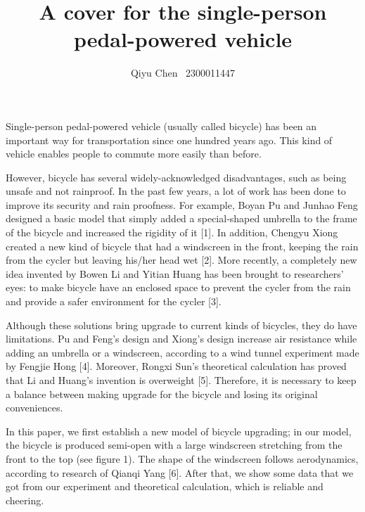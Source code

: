 \documentclass[a4paper,12pt]{article}
\title{A cover for the single-person pedal-powered vehicle}
\author{Qiyu Chen\,\,\, 2300011447}
\begin{document}
	\maketitle
	
	Single-person pedal-powered vehicle (usually called bicycle) has been an important way for transportation since one hundred years ago. This kind of vehicle enables people to commute more easily than before. 
	
	However, bicycle has several widely-acknowledged disadvantages, such as being unsafe and not rainproof. 
	In the past few years, a lot of work has been done to improve its security and rain proofness. For example, Boyan Pu and Junhao Feng designed a basic model that simply added a special-shaped umbrella to the frame of the bicycle and increased the rigidity of it [1]. In addition, Chengyu Xiong created a new kind of bicycle that had a windscreen in the front, keeping the rain from the cycler but leaving his/her head wet [2]. More recently, a completely new idea invented by Bowen Li and Yitian Huang has been brought to researchers’ eyes: to make bicycle have an enclosed space to prevent the cycler from the rain and provide a safer 
	environment for the cycler [3]. 
	
	Although these solutions bring upgrade to current kinds of bicycles, they do have limitations. Pu and Feng’s design and Xiong’s design increase air resistance while adding an umbrella or a windscreen, according to a wind tunnel experiment made by Fengjie Hong [4]. Moreover, Rongxi Sun’s theoretical calculation has proved that Li and Huang’s invention is overweight [5]. Therefore, it is necessary to keep a balance between making upgrade for the bicycle and losing its original conveniences.
	
	In this paper, we first establish a new model of bicycle upgrading; in our model, the bicycle is produced semi-open with a large windscreen stretching from the front to the top (see figure 1). The shape of the windscreen follows aerodynamics, according to research of Qianqi Yang [6]. After that, we show some data that we got from our experiment and theoretical calculation, which is reliable and cheering.
	
\end{document}
